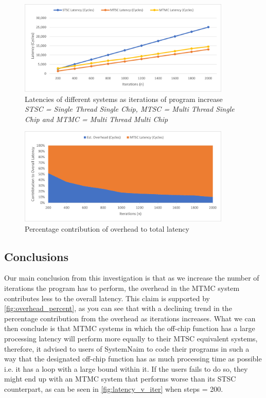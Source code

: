 \begin{figure}[!htb]
    \centering
    \includegraphics[width=0.9\textwidth]{05_evaluation/images/latency_vs_iter.png}
    \caption{Latencies of different systems as iterations of program increase \\ \textit{STSC = Single Thread Single Chip, MTSC = Multi Thread Single Chip and MTMC = Multi Thread Multi Chip }}
    \label{fig:latency_v_iter}
\end{figure}

\begin{figure}[!htb]
    \centering
    \includegraphics[width=0.9\textwidth]{05_evaluation/images/overhead_percentage.png}
    \caption{Percentage contribution of overhead to total latency}
    \label{fig:overhead_percent}
\end{figure}

\subsection{Conclusions}

Our main conclusion from this investigation is that as we increase the number of iterations the program has to perform, the overhead in the MTMC system contributes less to the overall latency. This claim is supported by \autoref{fig:overhead_percent}, as you can see that with a declining trend in the percentage contribution from the overhead as iterations increases. What we can then conclude is that MTMC systems in which the off-chip function has a large processing latency will perform more equally to their MTSC equivalent systems, therefore, it advised to users of SystemNaim to code their programs in such a way that the designated off-chip function has as much processing time as possible i.e. it has a loop with a large bound within it. If the users fails to do so, they might end up with an MTMC system that performs worse than its STSC counterpart, as can be seen in \autoref{fig:latency_v_iter} when steps = 200. 

